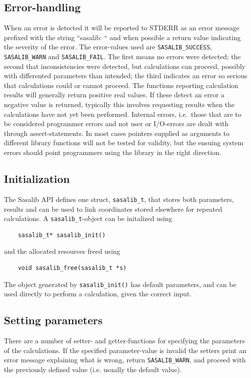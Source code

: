 \documentclass[a4paper,11pt]{article}
\begin{document}
\subsection{Error-handling}

When an error is detected it will be reported to STDERR as an error
message prefixed with the string ``sasalib: `` and when possible a
return value indicating the severity of the error. The error-values
used are \verb|SASALIB_SUCCESS|, \verb|SASALIB_WARN| and
\verb|SASALIB_FAIL|. The first means no errors were detected; the
second that inconsistencies were detected, but calculations can
proceed, possibly with differented parameters than intended; the third
indicates an error so serious that calculations could or cannot
proceed. The functions reporting calculation results will generally
return positive real values. If these detect an error a negative value
is returned, typically this involves requesting results when the
calculations have not yet been performed.  Internal errors,
i.e.\ those that are to be considered programmer errors and not user
or I/O-errors are dealt with through assert-statements. In most cases
pointers supplied as arguments to different library functions will not
be tested for validity, but the ensuing system errors should point
programmers using the library in the right direction.

\subsection{Initialization}

The Sasalib API defines one struct, \verb|sasalib_t|, that stores
both parameters, results and can be used to link coordinates stored
elsewhere for repeated calculations. A \verb|sasalib_t|-object can be
initalized using
\begin{verbatim}
    sasalib_t* sasalib_init()
\end{verbatim}
and the allocated resources freed using
\begin{verbatim}
    void sasalib_free(sasalib_t *s)
\end{verbatim}
The object generated by \verb|sasalib_init()| has default parameters,
and can be used directly to perform a calculation, given the correct
input.

\subsection{Setting parameters}

There are a number of setter- and getter-functions for specifying the
parameters of the calculations. If the specified parameter-value is
invalid the setters print an error message explaining what is wrong,
return \verb|SASALIB_WARN|, and proceed with the previously defined
value (i.e. usually the default value).
\end{document}

